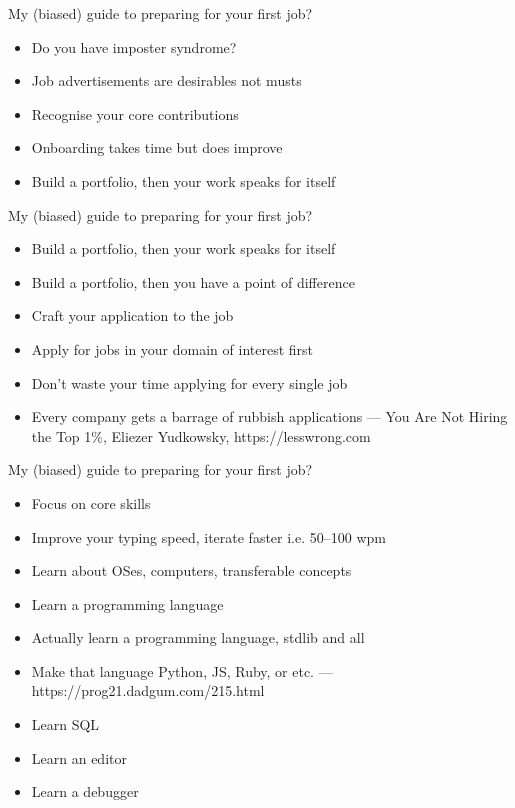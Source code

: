 \documentclass{beamer}
\begin{document}
\begin{frame}{My (biased) guide to preparing for your first job?}
\begin{itemize}
\item Do you have imposter syndrome?
\item Job advertisements are desirables not musts
\item Recognise your core contributions
\item Onboarding takes time but does improve
\item Build a portfolio, then your work speaks for itself
\end{itemize}
\end{frame}

\begin{frame}{My (biased) guide to preparing for your first job?}
\begin{itemize}
\item Build a portfolio, then your work speaks for itself
\item Build a portfolio, then you have a point of difference
\item Craft your application to the job
\item Apply for jobs in your domain of interest first
\item Don't waste your time applying for every single job
\item Every company gets a barrage of rubbish applications --- You Are Not Hiring the Top 1\%, Eliezer Yudkowsky, https://lesswrong.com
\end{itemize}
\end{frame}

\begin{frame}{My (biased) guide to preparing for your first job?}
\begin{itemize}
\item Focus on core skills
\item Improve your typing speed, iterate faster i.e. 50--100 wpm
\item Learn about OSes, computers, transferable concepts
\item Learn a programming language
\item Actually learn a programming language, stdlib and all
\item Make that language Python, JS, Ruby, or etc. --- https://prog21.dadgum.com/215.html
\item Learn SQL
\item Learn an editor
\item Learn a debugger
\end{itemize}
\end{frame}
\end{document}
